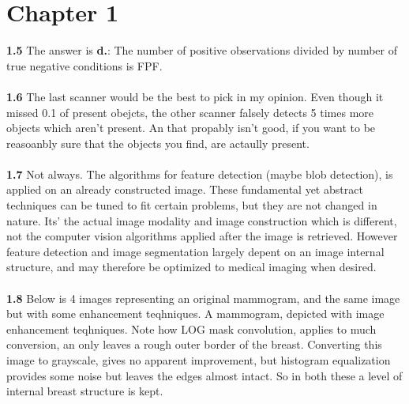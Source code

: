 \documentclass[]{article}
\begin{document}
\section{Chapter 1}
\textbf{1.5} The answer is \textbf{d.}: The number of positive observations divided by number of true negative conditions is FPF.\\\\
\textbf{1.6} The last scanner would be the best to pick in my opinion. Even though it missed 0.1 of present obejcts, the other scanner falsely detects 5 times more objects which aren't present. An that propably isn't good, if you want to be reasoanbly sure that the objects you find, are actaully present.\\\\
\textbf{1.7}
Not always. The algorithms for feature detection (maybe blob detection), is applied on an already constructed image. These fundamental yet abstract techniques can be tuned to fit certain problems, but they are not changed in nature. Its' the actual image modality and image construction which is different, not the computer vision algorithms applied after the image is retrieved. However feature detection and image segmentation largely depent on an image internal structure, and may therefore be optimized to medical imaging when desired.\\\\
\textbf{1.8}
Below is 4 images representing an original mammogram, and the same image but with some enhancement teqhniques. A mammogram, depicted with image enhancement teqhniques. Note how LOG mask convolution, applies to much conversion, an only leaves a rough outer border of the breast. Converting this image to grayscale, gives no apparent improvement, but histogram equalization provides some noise but leaves the edges almost intact. So in both these a level of internal breast structure is kept.\\\\
\end{document}
